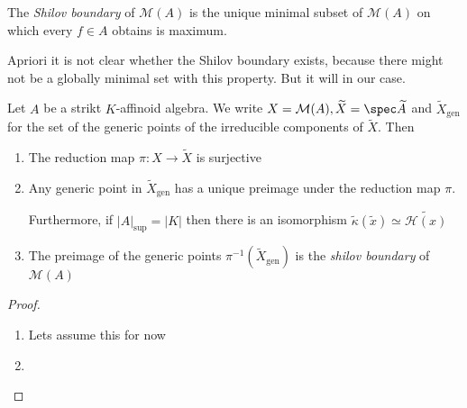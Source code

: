 \begin{definition}
	The \emph{Shilov boundary} of $\mathcal{M}(A)$ is the unique minimal subset of $\mathcal{M} (A)$ on which every $f \in A$ obtains is maximum. 
\end{definition}
Apriori it is not clear whether the Shilov boundary exists, because there might not be a globally minimal set with this property. But it will in our case. 

\begin{proposition}
	Let $A$ be a strikt $K$-affinoid algebra. We write $X = \mathcal{M} (A), \widetilde X = \spec \widetilde A$ and $\widetilde X _\text{gen} $ for the set of the generic points of the irreducible components of $\widetilde X$. 
	Then 
	\begin{enumerate}
		\item The reduction map $\pi: X \to \widetilde X$ is surjective
		\item Any generic point in $\widetilde X _\text{gen} $ has a unique preimage under the reduction map $\pi$. 

		Furthermore, if $|A|_\text{sup}  = |K|$ then there is an isomorphism $\tilde \kappa(\widetilde x) \simeq \widetilde{\mathcal{H} (x)}$

	\item The preimage of the generic points $\pi^{-1}(\widetilde X_\text{gen} )$ is the \emph{shilov boundary} of $\mathcal{M} (A)$ 
	\end{enumerate}
\end{proposition}

\begin{proof}
\begin{enumerate}
	\item Lets assume this for now 

	\item 
\end{enumerate}	
\end{proof}

